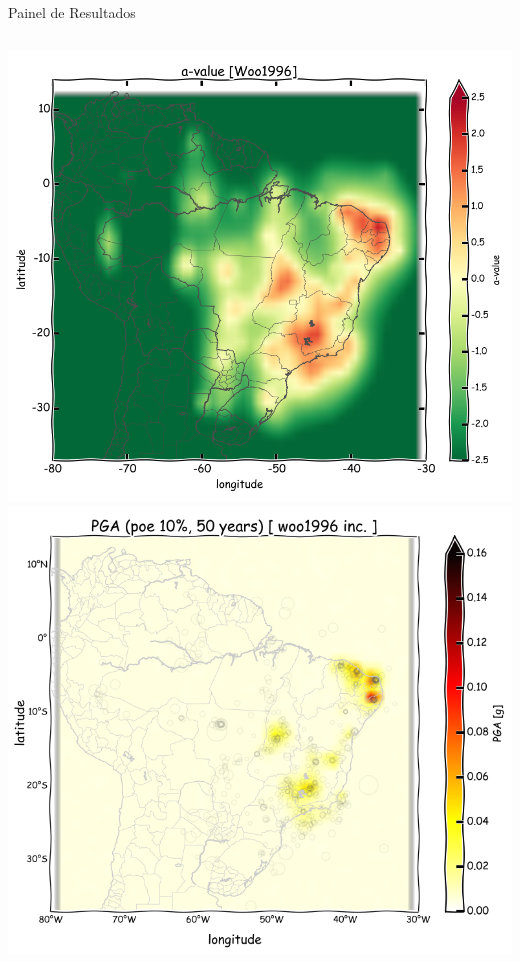 \documentclass[ucs,8pt]{beamer}
\begin{document}
\begin{frame}{Painel de Resultados}
\begin{columns}
	\begin{column}[T]{.24\textwidth}
		\includegraphics[width=1\textwidth]{a_woo} \\
		\includegraphics[width=1\textwidth]{pga_woo_inc}
	\end{column}
	

\end{columns}
\end{frame}
\end{document}
